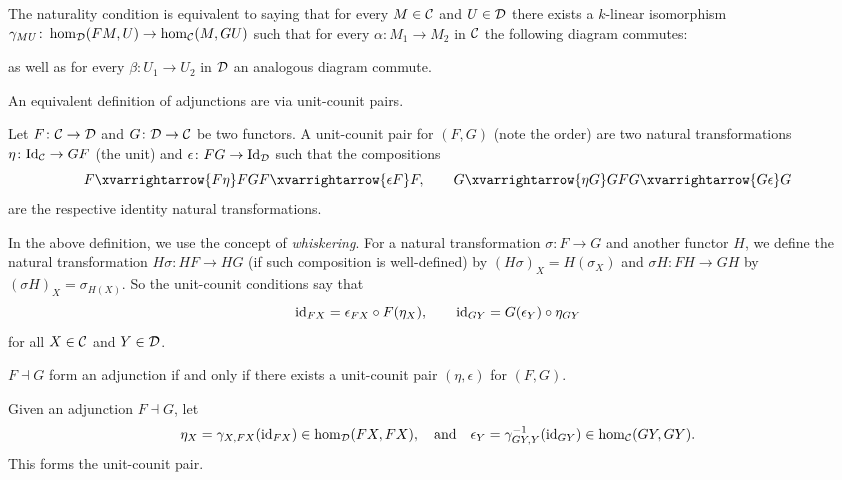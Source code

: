 \edefn

The naturality condition is equivalent to saying that for every $M\in{{\cal C}}$ and $U\in{{\cal D}}$ there exists a $k$-linear isomorphism $\gamma_{MU}\colon\hom_{{\cal D}}(FM,U)\to\hom_{{\cal C}}(M,GU)$ such that
for every $\alpha\colon M_1\to M_2$ in ${{\cal C}}$ the following diagram commutes:

\centerline{}

as well as for every $\beta\colon U_1\to U_2$ in ${{\cal D}}$ an analogous diagram commute.

An equivalent definition of adjunctions are via unit-counit pairs.

\bdefn

    Let $F\colon{{\cal C}}\to{{\cal D}}$ and $G\colon{{\cal D}}\to{{\cal C}}$ be two functors.
    A {\emphcolor unit-counit pair} for $(F,G)$ (note the order) are two natural transformations $\eta\colon{\rm Id}_{{\cal C}}\to GF$ (the unit) and $\epsilon\colon FG\to{\rm Id}_{{\cal D}}$ such that the compositions
    $$ F\xvarrightarrow{F\eta}FGF\xvarrightarrow{\epsilon F}F,\qquad G\xvarrightarrow{\eta G}GFG\xvarrightarrow{G\epsilon}G $$
    are the respective identity natural transformations.

\edefn

In the above definition, we use the concept of {\it whiskering}.
For a natural transformation $\sigma\colon F\to G$ and another functor $H$, we define the natural transformation $H\sigma\colon HF\to HG$ (if such composition is well-defined) by $(H\sigma)_X=H(\sigma_X)$
and $\sigma H\colon FH\to GH$ by $(\sigma H)_X=\sigma_{H(X)}$.
So the unit-counit conditions say that
$$ {\rm id}_{FX} = \epsilon_{FX}\circ F(\eta_X),\qquad {\rm id}_{GY} = G(\epsilon_Y)\circ\eta_{GY} $$
for all $X\in{{\cal C}}$ and $Y\in{{\cal D}}$.

\bthrm

    $F\dashv G$ form an adjunction if and only if there exists a unit-counit pair $(\eta,\epsilon)$ for $(F,G)$.

\ethrm

\bproof

    Given an adjunction $F\dashv G$, let
    $$ \eta_X=\gamma_{X,FX}({\rm id}_{FX})\in\hom_{{\cal D}}(FX,FX),\quad\hbox{and}\quad\epsilon_Y=\gamma^{-1}_{GY,Y}({\rm id}_{GY})\in\hom_{{\cal C}}(GY,GY) . $$
    This forms the unit-counit pair.

